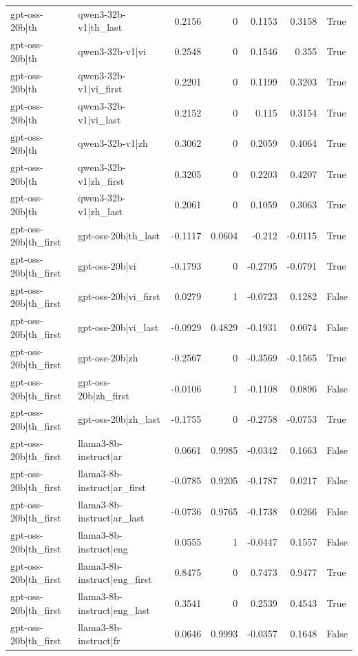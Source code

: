 \begin{table}
\begin{tabular}{l l r r r r l}
gpt-oss-20b|th & qwen3-32b-v1|th_last & 0.2156 & 0 & 0.1153 & 0.3158 & True \\
gpt-oss-20b|th & qwen3-32b-v1|vi & 0.2548 & 0 & 0.1546 & 0.355 & True \\
gpt-oss-20b|th & qwen3-32b-v1|vi_first & 0.2201 & 0 & 0.1199 & 0.3203 & True \\
gpt-oss-20b|th & qwen3-32b-v1|vi_last & 0.2152 & 0 & 0.115 & 0.3154 & True \\
gpt-oss-20b|th & qwen3-32b-v1|zh & 0.3062 & 0 & 0.2059 & 0.4064 & True \\
gpt-oss-20b|th & qwen3-32b-v1|zh_first & 0.3205 & 0 & 0.2203 & 0.4207 & True \\
gpt-oss-20b|th & qwen3-32b-v1|zh_last & 0.2061 & 0 & 0.1059 & 0.3063 & True \\
gpt-oss-20b|th_first & gpt-oss-20b|th_last & -0.1117 & 0.0604 & -0.212 & -0.0115 & True \\
gpt-oss-20b|th_first & gpt-oss-20b|vi & -0.1793 & 0 & -0.2795 & -0.0791 & True \\
gpt-oss-20b|th_first & gpt-oss-20b|vi_first & 0.0279 & 1 & -0.0723 & 0.1282 & False \\
gpt-oss-20b|th_first & gpt-oss-20b|vi_last & -0.0929 & 0.4829 & -0.1931 & 0.0074 & False \\
gpt-oss-20b|th_first & gpt-oss-20b|zh & -0.2567 & 0 & -0.3569 & -0.1565 & True \\
gpt-oss-20b|th_first & gpt-oss-20b|zh_first & -0.0106 & 1 & -0.1108 & 0.0896 & False \\
gpt-oss-20b|th_first & gpt-oss-20b|zh_last & -0.1755 & 0 & -0.2758 & -0.0753 & True \\
gpt-oss-20b|th_first & llama3-8b-instruct|ar & 0.0661 & 0.9985 & -0.0342 & 0.1663 & False \\
gpt-oss-20b|th_first & llama3-8b-instruct|ar_first & -0.0785 & 0.9205 & -0.1787 & 0.0217 & False \\
gpt-oss-20b|th_first & llama3-8b-instruct|ar_last & -0.0736 & 0.9765 & -0.1738 & 0.0266 & False \\
gpt-oss-20b|th_first & llama3-8b-instruct|eng & 0.0555 & 1 & -0.0447 & 0.1557 & False \\
gpt-oss-20b|th_first & llama3-8b-instruct|eng_first & 0.8475 & 0 & 0.7473 & 0.9477 & True \\
gpt-oss-20b|th_first & llama3-8b-instruct|eng_last & 0.3541 & 0 & 0.2539 & 0.4543 & True \\
gpt-oss-20b|th_first & llama3-8b-instruct|fr & 0.0646 & 0.9993 & -0.0357 & 0.1648 & False \\

\end{tabular}
\end{table}
